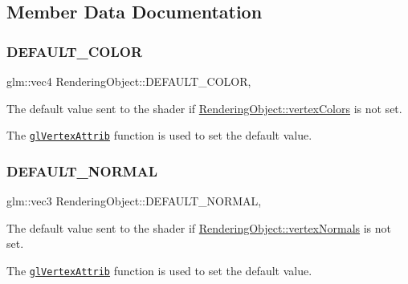 \subsection{Member Data Documentation}
\hypertarget{class_rendering_object_a3bf21996dc0ef604b2b81d95275c97f9}{}\label{class_rendering_object_a3bf21996dc0ef604b2b81d95275c97f9}
\subsubsection{\texorpdfstring{D\+E\+F\+A\+U\+L\+T\+\_\+\+C\+O\+L\+OR}{DEFAULT\_COLOR}}
{\footnotesize\ttfamily glm\+::vec4 Rendering\+Object\+::\+D\+E\+F\+A\+U\+L\+T\+\_\+\+C\+O\+L\+OR\hspace{0.3cm}{\ttfamily [static]}, {\ttfamily [protected]}}



The default value sent to the shader if \hyperlink{class_rendering_object_a65fc52e665791ce55e43106b603e917a}{Rendering\+Object\+::vertex\+Colors} is not set.

The \href{https://www.opengl.org/sdk/docs/man/html/glVertexAttrib.xhtml}{\tt gl\+Vertex\+Attrib} function is used to set the default value. \hypertarget{class_rendering_object_af270a476ba12c23fefbb034e21930add}{}\label{class_rendering_object_af270a476ba12c23fefbb034e21930add}
\subsubsection{\texorpdfstring{D\+E\+F\+A\+U\+L\+T\+\_\+\+N\+O\+R\+M\+AL}{DEFAULT\_NORMAL}}
{\footnotesize\ttfamily glm\+::vec3 Rendering\+Object\+::\+D\+E\+F\+A\+U\+L\+T\+\_\+\+N\+O\+R\+M\+AL\hspace{0.3cm}{\ttfamily [static]}, {\ttfamily [protected]}}



The default value sent to the shader if \hyperlink{class_rendering_object_ac28d301f97d29ab603f65f8e823063b4}{Rendering\+Object\+::vertex\+Normals} is not set.

The \href{https://www.opengl.org/sdk/docs/man/html/glVertexAttrib.xhtml}{\tt gl\+Vertex\+Attrib} function is used to set the default value. \hypertarget{class_rendering_object_a3dcb28a12f578630aea75cc59ea39588}{}\label{class_rendering_object_a3dcb28a12f578630aea75cc59ea39588}
